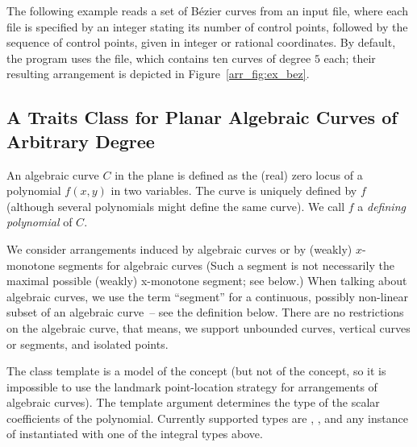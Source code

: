 The following example reads a set of B\'ezier curves from an input
file, where each file is specified by an integer stating its number
of control points, followed by the sequence of control points, given
in integer or rational coordinates. By default, the program uses
the  file, which contains ten curves of degree $5$
each; their resulting arrangement is depicted in
Figure~\ref{arr_fig:ex_bez}.


\subsection{A Traits Class for Planar Algebraic Curves of Arbitrary Degree
  \label{arr_ssec:tr_alg}}

An algebraic curve $C$ in the plane is defined as the (real) zero locus
of a polynomial $f(x,y)$ in two variables. The curve is uniquely defined
by $f$ (although several polynomials might define the same curve). 
We call $f$ a \emph{defining polynomial} of $C$.

We consider arrangements induced by algebraic curves
or by (weakly) $x$-monotone segments for algebraic curves
(Such a segment is not necessarily the maximal possible 
(weakly) x-monotone segment; see below.)
When talking about algebraic curves, 
we use the term ``segment'' for a continuous, possibly non-linear subset 
of an algebraic curve~-- see the definition below.
There are no restrictions on the algebraic curve, that means, 
we support unbounded curves, vertical curves or segments, and isolated points.

The  class template 
is a model of the  concept (but not of the
 concept, so it is impossible
to use the landmark point-location strategy for arrangements of
algebraic curves).
The template argument  determines 
the type of the scalar coefficients of the polynomial. 
Currently supported types are , , 
and any instance of  
instantiated with one of the integral types above.

